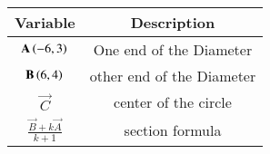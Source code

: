\begin{tabular}[12pt]{ |c| c|}
    \hline
        \textbf{Variable} & \textbf{Description} \\
    \hline
        $\mathbf{A}\left(-6,3\right)$ & One end of the Diameter  \\
    \hline 
        $\mathbf{B} \left(6,4\right)$ & other end of the Diameter \\
    \hline
        $\vec{C}$& center of the circle \\ 
    \hline
        $\frac{\vec{B}+k\vec{A}}{k+1}$ & section formula\\
    \hline       
\end{tabular}

